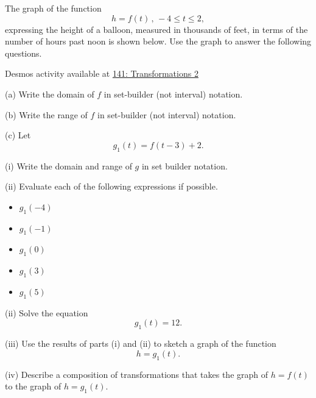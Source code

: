 \documentclass{ximera}
\begin{document}
\begin{question}  \label{Q:3d3rfff}
The graph of the function
\[
   h = f(t) \,  ,  \, -4 \leq t \leq 2,
\]
expressing the height of a balloon, measured in thousands of feet, in terms of the number of hours past noon is shown below. Use the graph to answer the following questions.


\begin{onlineOnly}
    \begin{center}
\end{center}
\end{onlineOnly}

Desmos activity available at \href{https://www.desmos.com/calculator/xupooue7ew}{141: Transformations 2}


(a) Write the domain of $f$ in set-builder (not interval) notation.

(b) Write the range of $f$ in set-builder (not interval) notation.

(c) Let 
\[
    g_1(t) = f(t-3) + 2 .
\]
 
(i) Write the domain and range of $g$ in set builder notation.

(ii) Evaluate each of the following expressions if possible.

\begin{itemize}
\item{$g_1(-4)$}

\item{$g_1(-1)$}

\item{$g_1(0)$}

\item{$g_1(3)$}

\item{$g_1(5)$}
\end{itemize}

(ii) Solve the equation
\[
 g_1(t)=12 .
\]







(iii) Use the results of parts (i) and (ii) to sketch a graph of the function 
\[
      h = g_1(t).
\]

(iv) Describe a composition of transformations that takes the graph of $h=f(t)$ to the graph of $h=g_1(t)$.

\end{question}
\end{document}
